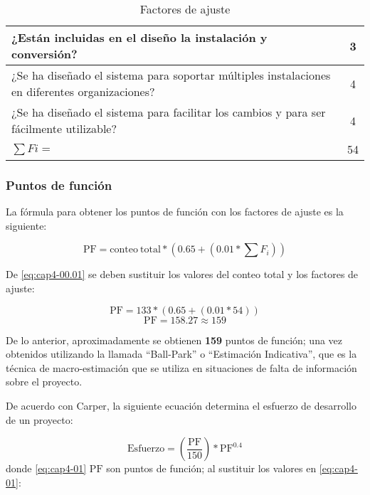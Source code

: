 \begin{table}
\begin{tabular}{|p{9cm}|c|}
		¿Están incluidas en el diseño la instalación y conversión?                                                               & 3           \\ \hline
		¿Se ha diseñado el sistema para soportar múltiples instalaciones en diferentes organizaciones?                           & 4           \\ \hline
		¿Se ha diseñado el sistema para facilitar los cambios y para ser fácilmente utilizable?                                  & 4           \\ \hline
		\centering $\sum Fi=$                                                                                                  	 & 54          \\ \hline
		\end{tabular}
		\caption{Factores de ajuste}
		\label{tab:questions_adjusment}
		\end{table}


\subsubsection*{Puntos de función}

La fórmula para obtener los puntos de función con los factores de ajuste es la siguiente:

\begin{equation} \label{eq:cap4-00.01}
	\mathrm{PF} = \mathrm{conteo\ total} *  (0.65 + (0.01 * \sum F_i)) 
\end{equation}
	
De \eqref{eq:cap4-00.01} se deben sustituir los valores del conteo total y los factores de ajuste:

\begin{equation} \label{eq:cap4-00.02}
	\mathrm{PF} =  133 *  (0.65 + (0.01 * 54))
\end{equation}
\begin{equation} \label{eq:cap4-00.03}
	\mathrm{PF} = 158.27 \approx 159
\end{equation}
	
		
De lo anterior, aproximadamente se obtienen \textbf{159} puntos de función; una vez obtenidos utilizando la llamada ``Ball-Park'' o ``Estimación Indicativa'', que es la técnica de macro-estimación que se utiliza en situaciones de falta de información sobre el proyecto.


De acuerdo con Carper\cite{abran_applied_2006}, la siguiente ecuación determina el esfuerzo de desarrollo de un proyecto:


\begin{equation} \label{eq:cap4-01}
	\mathrm{Esfuerzo} = (\frac{\mathrm{PF}}{150})*\mathrm{PF}^{0.4} 
\end{equation}
donde \eqref{eq:cap4-01} $\mathrm{PF}$ son puntos de función; al sustituir los valores en \eqref{eq:cap4-01}:

